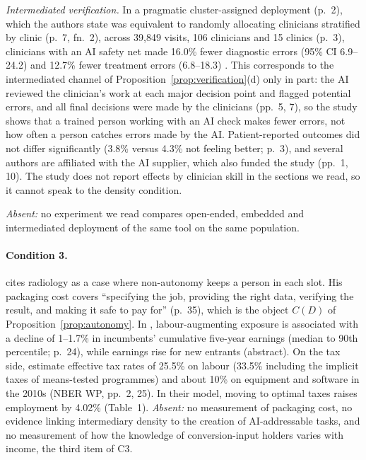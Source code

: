 \documentclass[12pt]{article}
\theoremstyle{remark}
\begin{document}
\emph{Intermediated verification.} In a pragmatic cluster-assigned deployment (p.~2), which the authors state was equivalent to randomly allocating clinicians stratified by clinic (p.~7, fn.~2), across 39,849 visits, 106 clinicians and 15 clinics (p.~3), clinicians with an AI safety net made 16.0\% fewer diagnostic errors (95\% CI 6.9--24.2) and 12.7\% fewer treatment errors (6.8--18.3) \citep[Table~3, p.~16]{korom2025penda}. This corresponds to the intermediated channel of Proposition~\ref{prop:verification}(d) only in part: the AI reviewed the clinician's work at each major decision point and flagged potential errors, and all final decisions were made by the clinicians (pp.~5, 7), so the study shows that a trained person working with an AI check makes fewer errors, not how often a person catches errors made by the AI. Patient-reported outcomes did not differ significantly (3.8\% versus 4.3\% not feeling better; p.~3), and several authors are affiliated with the AI supplier, which also funded the study (pp.~1, 10). The study does not report effects by clinician skill in the sections we read, so it cannot speak to the density condition.

\emph{Absent:} no experiment we read compares open-ended, embedded and intermediated deployment of the same tool on the same population.

\paragraph{Condition 3.} \citet[pp.~34--35]{garicano2026comment} cites radiology as a case where non-autonomy keeps a person in each slot. His packaging cost covers ``specifying the job, providing the right data, verifying the result, and making it safe to pay for'' (p.~35), which is the object $C(D)$ of Proposition~\ref{prop:autonomy}. In \citet{kogan2023displacement}, labour-augmenting exposure is associated with a decline of 1--1.7\% in incumbents' cumulative five-year earnings (median to 90th percentile; p.~24), while earnings rise for new entrants (abstract). On the tax side, \citet{acemoglu2020tax} estimate effective tax rates of 25.5\% on labour (33.5\% including the implicit taxes of means-tested programmes) and about 10\% on equipment and software in the 2010s (NBER WP, pp.~2, 25). In their model, moving to optimal taxes raises employment by 4.02\% (Table~1). \emph{Absent:} no measurement of packaging cost, no evidence linking intermediary density to the creation of AI-addressable tasks, and no measurement of how the knowledge of conversion-input holders varies with income, the third item of C3.
\end{document}
